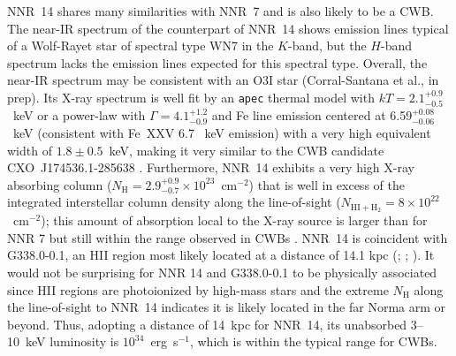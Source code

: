 \documentclass[iop,revtex4]{emulateapj}
\begin{document}
NNR~14 shares many similarities with NNR~7 and is also likely to be a CWB.  The near-IR spectrum of the counterpart of NNR~14 shows emission lines typical of a Wolf-Rayet star of spectral type WN7 in the $K$-band, but the $H$-band spectrum lacks the emission lines expected for this spectral type.  Overall, the near-IR spectrum may be consistent with an O3I star (Corral-Santana et al., in prep).  Its X-ray spectrum is well fit by an \texttt{apec} thermal model with $kT=2.1^{+0.9}_{-0.5}$~keV or a power-law with $\Gamma=4.1^{+1.2}_{-0.9}$ and Fe line emission centered at 6.59$^{+0.08}_{-0.06}$~keV (consistent with Fe~XXV 6.7 ~keV emission) with a very high equivalent width of $1.8\pm0.5$~keV, making it very similar to the CWB candidate CXO~J174536.1-285638 \citep{mikles06}.  Furthermore, NNR~14 exhibits a very high X-ray absorbing column ($N_{\mathrm{H}} = 2.9^{+0.9}_{-0.7}\times10^{23}$~cm$^{-2}$) that is well in excess of the integrated interstellar column density along the line-of-sight ($N_{\mathrm{HI+H_2}}=8\times10^{22}$~cm$^{-2}$); this amount of absorption local to the X-ray source is larger than for NNR 7 but still within the range observed in CWBs \citep{hamaguchi07}.  NNR~14 is coincident with G338.0-0.1, an H{\small II} region most likely located at a distance of 14.1 kpc (\citealt{wilson70}; \citealt{kuchar97}; \citealt{jones12}).  It would not be surprising for NNR 14 and G338.0-0.1 to be physically associated since H{\small II} regions are photoionized by high-mass stars and the extreme $N_{\mathrm{H}}$ along the line-of-sight to NNR~14 indicates it is likely located in the far Norma arm or beyond.  Thus, adopting a distance of 14~kpc for NNR~14, its unabsorbed 3--10~keV luminosity is $10^{34}$~erg~s$^{-1}$, which is within the typical range for CWBs. \par
\end{document}
